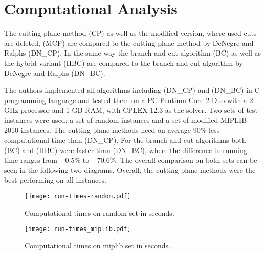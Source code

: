\documentclass{article}
\begin{document}
\section{Computational Analysis}

The cutting plane method (CP) as well as the modified version, where used cuts are deleted, (MCP) are compared to the cutting plane method by DeNegre and Ralphs (DN\_CP).
In the same way the branch and cut algorithm (BC) as well as the hybrid variant (HBC) are compared to the branch and cut algorithm by DeNegre and Ralphs (DN\_BC).

The authors implemented all algorithms including (DN\_CP) and (DN\_BC) in C programming language and tested them on a PC Pentium Core 2 Duo with a 2 GHz processor and 1 GB RAM, with CPLEX 12.3 as the solver. 
Two sets of test instances were used: a set of random instances and a set of modified MIPLIB 2010 instances. 
The cutting plane methods need on average $90\%$ less computational time than (DN\_CP). For the branch and cut algorithms both (BC) and (HBC) were faster than (DN\_BC), where the difference in running time ranges from $-0.5\%$ to $-70.6\%$. The overall comparison on both sets can be seen in the following two diagrams. Overall, the cutting plane methods were the best-performing on all instances.


\begin{figure}[H]
	\centering
		\texttt{[image: run-times-random.pdf]}
	\caption{Computational times on random set in seconds.}
\end{figure}
\begin{figure}[H]
	\centering
	\texttt{[image: run-times\_miplib.pdf]}
	\caption{Computational times on miplib set in seconds.}
\end{figure}
	\vspace{1cm}
	
	
\end{document}
